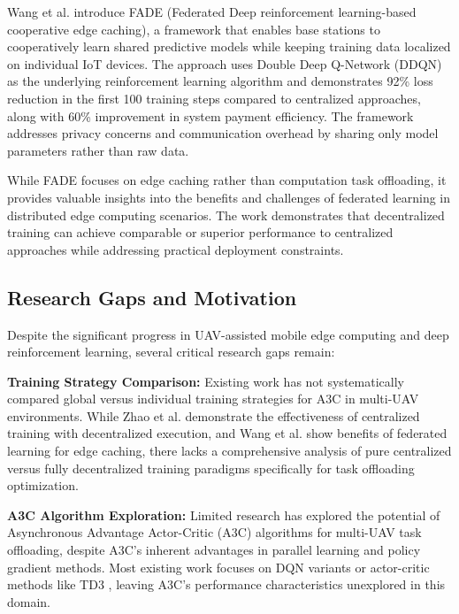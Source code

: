 \documentclass[journal]{IEEEtran}
\begin{document}
Wang et al. \cite{wang2020federated} introduce FADE (Federated Deep reinforcement learning-based cooperative edge caching), a framework that enables base stations to cooperatively learn shared predictive models while keeping training data localized on individual IoT devices. The approach uses Double Deep Q-Network (DDQN) as the underlying reinforcement learning algorithm and demonstrates 92\% loss reduction in the first 100 training steps compared to centralized approaches, along with 60\% improvement in system payment efficiency. The framework addresses privacy concerns and communication overhead by sharing only model parameters rather than raw data.

While FADE focuses on edge caching rather than computation task offloading, it provides valuable insights into the benefits and challenges of federated learning in distributed edge computing scenarios. The work demonstrates that decentralized training can achieve comparable or superior performance to centralized approaches while addressing practical deployment constraints.

\subsection{Research Gaps and Motivation}

Despite the significant progress in UAV-assisted mobile edge computing and deep reinforcement learning, several critical research gaps remain:

\textbf{Training Strategy Comparison:} Existing work has not systematically compared global versus individual training strategies for A3C in multi-UAV environments. While Zhao et al. \cite{zhao2022multiagent} demonstrate the effectiveness of centralized training with decentralized execution, and Wang et al. \cite{wang2020federated} show benefits of federated learning for edge caching, there lacks a comprehensive analysis of pure centralized versus fully decentralized training paradigms specifically for task offloading optimization.

\textbf{A3C Algorithm Exploration:} Limited research has explored the potential of Asynchronous Advantage Actor-Critic (A3C) algorithms for multi-UAV task offloading, despite A3C's inherent advantages in parallel learning and policy gradient methods. Most existing work focuses on DQN variants \cite{song2024drqn} or actor-critic methods like TD3 \cite{zhao2022multiagent}, leaving A3C's performance characteristics unexplored in this domain.
\end{document}
